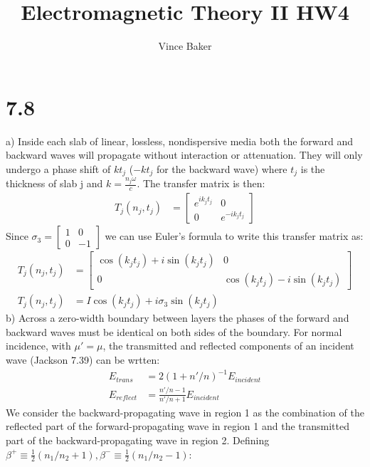 \documentclass[a4paper,11pt]{article}
\title{Electromagnetic Theory II HW4}
\author{Vince Baker}
\numberwithin{equation}{section}
\newcommand{\lrp}[1]{\left({#1}\right)}
\begin{document}
\maketitle

\section*{7.8}
a) Inside each slab of linear, lossless, nondispersive media both the forward and backward waves will propagate without interaction or attenuation.
They will only undergo a phase shift of $kt_j$ ($-kt_j$ for the backward wave) where $t_j$ is the thickness of slab j and $k=\frac{n_j\omega}{c}$.
The transfer matrix is then:
\begin{align}
 T_j(n_j,t_j) &= \begin{bmatrix}
                  e^{ik_jt_j} & 0 \\
                  0           & e^{-ik_jt_j}
                 \end{bmatrix}
\end{align}
Since $\sigma_3 = \begin{bmatrix}1 & 0\\ 0 & -1 \end{bmatrix}$ we can use Euler's formula to write this transfer matrix as:
\begin{align}
 T_j(n_j,t_j) &= \begin{bmatrix}
                  \cos{(k_jt_j)}+i\sin{(k_jt_j)} & 0 \\
                  0           & \cos{(k_jt_j)}-i\sin{(k_jt_j)}
                 \end{bmatrix}\\
 T_j(n_j,t_j) &= I\cos{(k_jt_j)}+i\sigma_3\sin{(k_jt_j)}
\end{align}
b) Across a zero-width boundary between layers the phases of the forward and backward waves must be identical on both sides of the boundary.
For normal incidence, with $\mu' = \mu$, the transmitted and reflected components of an incident wave (Jackson 7.39) can be wrtten:
\begin{align}
 E_{trans} &= 2\lrp{1+n'/n}^{-1}E_{incident}\\
 E_{reflect} &= \frac{n'/n-1}{n'/n+1}E_{incident}
\end{align}
We consider the backward-propagating wave in region 1 as the combination of the reflected part of the forward-propagating wave in region 1 and the transmitted part of the backward-propagating wave in region 2.
Defining $\beta^+ \equiv \frac{1}{2}(n_1/n_2+1), \beta^- \equiv \frac{1}{2}(n_1/n_2-1)$:
\end{document}
